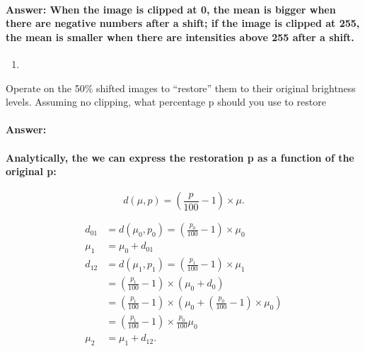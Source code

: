 \documentclass[11pt]{article}
\begin{document}
\hypertarget{answer-when-the-image-is-clipped-at-0-the-mean-is-bigger-when-there-are-negative-numbers-after-a-shift-if-the-image-is-clipped-at-255-the-mean-is-smaller-when-there-are-intensities-above-255-after-a-shift.}{%
\paragraph{Answer: When the image is clipped at 0, the mean is bigger
when there are negative numbers after a shift; if the image is clipped
at 255, the mean is smaller when there are intensities above 255 after a
shift.}\label{answer-when-the-image-is-clipped-at-0-the-mean-is-bigger-when-there-are-negative-numbers-after-a-shift-if-the-image-is-clipped-at-255-the-mean-is-smaller-when-there-are-intensities-above-255-after-a-shift.}}

    \begin{enumerate}
\def\labelenumi{\arabic{enumi}.}
\setcounter{enumi}{7}
\item
\end{enumerate}

Operate on the 50\% shifted images to ``restore'' them to their original
brightness levels. Assuming no clipping, what percentage p should you
use to restore

\hypertarget{answer}{%
\paragraph{Answer:}\label{answer}}

\hypertarget{analytically-the-we-can-express-the-restoration-p-as-a-function-of-the-original-p}{%
\paragraph{Analytically, the we can express the restoration p as a
function of the original
p:}\label{analytically-the-we-can-express-the-restoration-p-as-a-function-of-the-original-p}}

\[
d(\mu, p) = (\frac{p}{100}-1) \times \mu.
\]

\[
\begin{equation}
    \begin{split}
        d_{01} & = d(\mu_0, p_0) = (\frac{p_0}{100}-1) \times \mu_0 \\
        \mu_1 & = \mu_0 + d_{01} \\
        d_{12} & = d(\mu_1, p_1) = (\frac{p_1}{100}-1) \times \mu_1 \\
            & = (\frac{p_1}{100}-1) \times (\mu_0 + d_0) \\
            & = (\frac{p_1}{100}-1) \times (\mu_0 + (\frac{p_0}{100}-1) \times \mu_0) \\
            & = (\frac{p_1}{100}-1) \times \frac{p_0}{100} \mu_0 \\
        \mu_2 & = \mu_1 + d_{12}.
    \end{split}
\end{equation}
\]
\end{document}
